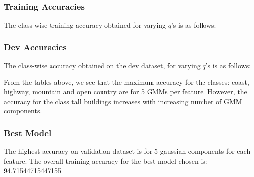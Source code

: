 \documentclass[11pt,a4paper]{article}
\newcommand{\noi}{\noindent}
\begin{document}
\subsubsection{Training Accuracies}
The class-wise training accuracy obtained for varying $q$'s is as follows:



\subsubsection{Dev Accuracies}
The class-wise accuracy obtained on the dev dataset, for varying $q$'s is as follows:


\noi
From the tables above, we see that the maximum accuracy for the classes: coast, highway, mountain and open country are for 5 GMMs per feature. However, the accuracy for the class tall buildings increases with increasing number of GMM components.

\subsubsection{Best Model}
The highest accuracy on validation dataset is for 5 gaussian components for each feature. The overall training accuracy for the best model chosen is: 94.71544715447155\\
\end{document}
